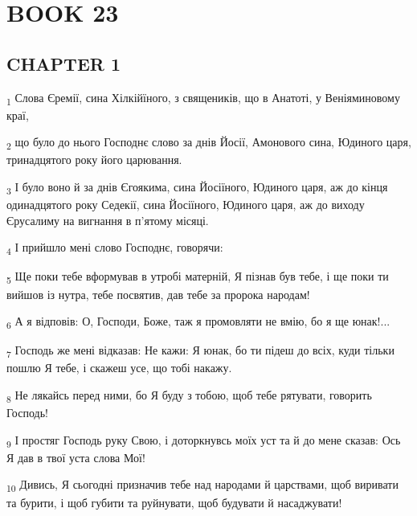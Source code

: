 \section{BOOK 23}
\subsection{CHAPTER 1}
\begin{tcolorbox}
\textsubscript{1} Слова Єремії, сина Хілкійїного, з священиків, що в Анатоті, у Веніяминовому краї,
\end{tcolorbox}
\begin{tcolorbox}
\textsubscript{2} що було до нього Господнє слово за днів Йосії, Амонового сина, Юдиного царя, тринадцятого року його царювання.
\end{tcolorbox}
\begin{tcolorbox}
\textsubscript{3} І було воно й за днів Єгоякима, сина Йосіїного, Юдиного царя, аж до кінця одинадцятого року Седекії, сина Йосіїного, Юдиного царя, аж до виходу Єрусалиму на вигнання в п'ятому місяці.
\end{tcolorbox}
\begin{tcolorbox}
\textsubscript{4} І прийшло мені слово Господнє, говорячи:
\end{tcolorbox}
\begin{tcolorbox}
\textsubscript{5} Ще поки тебе вформував в утробі матерній, Я пізнав був тебе, і ще поки ти вийшов із нутра, тебе посвятив, дав тебе за пророка народам!
\end{tcolorbox}
\begin{tcolorbox}
\textsubscript{6} А я відповів: О, Господи, Боже, таж я промовляти не вмію, бо я ще юнак!...
\end{tcolorbox}
\begin{tcolorbox}
\textsubscript{7} Господь же мені відказав: Не кажи: Я юнак, бо ти підеш до всіх, куди тільки пошлю Я тебе, і скажеш усе, що тобі накажу.
\end{tcolorbox}
\begin{tcolorbox}
\textsubscript{8} Не лякайсь перед ними, бо Я буду з тобою, щоб тебе рятувати, говорить Господь!
\end{tcolorbox}
\begin{tcolorbox}
\textsubscript{9} І простяг Господь руку Свою, і доторкнувсь моїх уст та й до мене сказав: Ось Я дав в твої уста слова Мої!
\end{tcolorbox}
\begin{tcolorbox}
\textsubscript{10} Дивись, Я сьогодні призначив тебе над народами й царствами, щоб виривати та бурити, і щоб губити та руйнувати, щоб будувати й насаджувати!
\end{tcolorbox}
